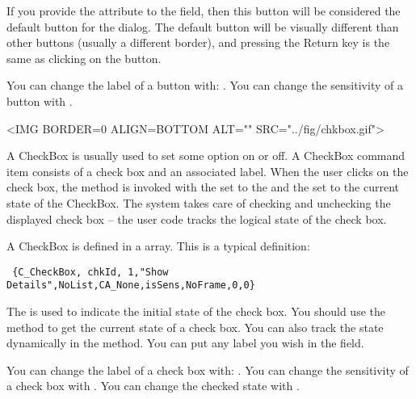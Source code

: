 If you provide the attribute  to the
 field, then this button will be considered
the default button for the dialog. The default button will be
visually different than other buttons (usually a different
border), and pressing the Return key is the same as clicking on
the button.

You can change the label of a button with:
 . You can change the
sensitivity of a button with .


\small
\begin{rawhtml}
<IMG BORDER=0 ALIGN=BOTTOM ALT="" SRC="../fig/chkbox.gif">
\end{rawhtml}
\begin{latexonly}

\end{latexonly}
\normalfont\normalsize

\vspace{.1in}

A CheckBox is usually used to set some option on or off. A
CheckBox command item consists of a check box and an associated
label. When the user clicks on the check box, the 
method is invoked with the  set to the  and
the  set to the current state of the CheckBox. The
system takes care of checking and unchecking the displayed check
box -- the user code tracks the logical state of the check box.

A CheckBox is defined in a  array. This is a
typical definition:

\footnotesize
\begin{verbatim}
 {C_CheckBox, chkId, 1,"Show Details",NoList,CA_None,isSens,NoFrame,0,0}
\end{verbatim}
\normalfont\normalsize

The  is used to indicate the initial state of the
check box. You should use the  method to get the
current state of a check box. You can also track the state
dynamically in the  method. You can put any
label you wish in the  field.

You can change the label of a check box with: 
. You can change the sensitivity of a check
box with . You can
change the checked state with .

